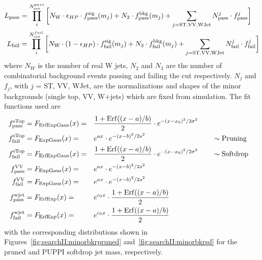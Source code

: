 \begin{align*}
\footnotesize
    L_{\rm pass} &= \prod_{i}^{N_{\rm evt}^{pass}} \bigg[N_{\rm W}\cdot\epsilon_{HP}\cdot f_{\rm pass}^{\rm sig}(m_{j}) + N_{\rm 2}\cdot f_{\rm pass}^{\rm bkg}(m_{j})+ \sum_{j=\textrm{ST,VV,WJet}} N^{j}_{\rm pass}\cdot f_{\rm pass}^{j}\bigg]\\
    L_{\rm fail} &= \prod_{i}^{N_{\rm evt}^{fail}} \bigg[N_{\rm W}\cdot(1-\epsilon_{HP})\cdot f^{\rm sig}_{\rm fail}(m_{j}) + N_{\rm 3}\cdot f_{\rm fail}^{\rm bkg}(m_{j})+ \sum_{j=\textrm{ST,VV,WJet}} N^{j}_{\rm fail}\cdot f_{\rm fail}^{j}\bigg]
\end{align*}
where $N_{W}$ is the number of real W jets, $N_{2}$ and $N_{3}$ are the number of combinatorial background events passing and failing the \nsubj cut respectively. $N_{j}$ and $f_{j}$, with $j$ = ST, VV, WJet, are the normalizations and shapes of the minor backgrounds (single top, VV, W+jets) which are fixed from simulation. The fit functions used are
\begin{alignat*}{3}
    f_{\rm pass}^{\rm sTop} &= F_{\rm ErfExpGaus}(x) = &&\frac{1 + {\rm Erf}((x-a)/b)}{2} \cdot e^{-(x-x_{0})^{2}/2\sigma^{2}}\\
    f_{\rm fail}^{\rm sTop} &= F_{\rm ExpGaus}(x)    = &&e^{ax} \cdot e^{-(x-b)^{2}/2s^{2}} && \quad \sim\rm{ Pruning}\\
    f_{\rm fail}^{\rm sTop} &= F_{\rm ErfExpGaus}(x) = &&\frac{1 + {\rm Erf}((x-a)/b)}{2} \cdot e^{-(x-x_{0})^{2}/2\sigma^{2}} && \quad \sim \rm{ Softdrop}\\
    f_{\rm pass}^{\rm VV}   &= F_{\rm ExpGaus}(x)    = &&e^{ax} \cdot e^{-(x-b)^{2}/2s^{2}}\\
    f_{\rm fail}^{\rm VV}   &= F_{\rm ExpGaus}(x)    = &&e^{ax} \cdot e^{-(x-b)^{2}/2s^{2}}\\
    f_{\rm pass}^{\rm wjet} &= F_{\rm ErfExp}(x)     = &&e^{c_0x} \cdot \frac{1 + {\rm Erf}((x-a)/b)}{2}\\
    f_{\rm fail}^{\rm wjet} &= F_{\rm ErfExp}(x)     = &&e^{c_0x} \cdot \frac{1 + {\rm Erf}((x-a)/b)}{2}
\end{alignat*}
with the corresponding distributions shown in Figures~\ref{fig:searchII:minorbkrpruned} and~\ref{fig:searchII:minorbkrsd} for the pruned and PUPPI softdrop jet mass, respectively.
